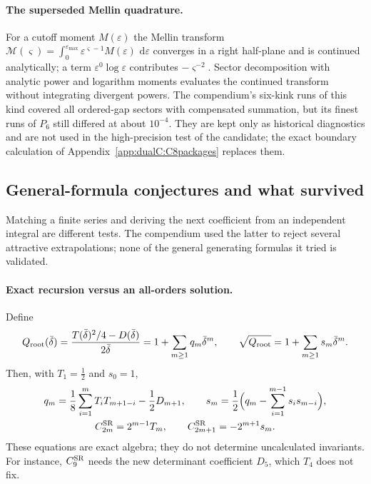 \documentclass[11pt,a4paper]{article}
\numberwithin{equation}{section}
\newcommand{\dd}{\,\mathrm d}
\newcommand{\CSR}{C^{\rm SR}}
\newcommand{\db}{\bar\delta}
\begin{document}
\paragraph{The superseded Mellin quadrature.} For a cutoff moment $M(\varepsilon)$ the Mellin transform
$\mathcal M(\varsigma)=\int_0^{\varepsilon_{\max}}\varepsilon^{\varsigma-1}M(\varepsilon)\,\dd\varepsilon$ converges
in a right half-plane and is continued analytically; a term $\varepsilon^0\log\varepsilon$ contributes
$-\varsigma^{-2}$. Sector
decomposition with analytic power and logarithm moments evaluates the continued transform without integrating
divergent powers. The compendium's six-kink runs of this kind covered all ordered-gap sectors with compensated
summation, but its finest runs of $P_6$ still differed at about $10^{-4}$. They are kept only as historical
diagnostics and are not used in the high-precision test of the candidate; the exact boundary calculation of
Appendix~\ref{app:dualC:C8packages} replaces them.

\subsection{General-formula conjectures and what survived}\label{app:dualC:conjectures}
Matching a finite series and deriving the next coefficient from an independent integral are different tests. The
compendium used the latter to reject several attractive extrapolations; none of the general generating formulas it
tried is validated.

\paragraph{Exact recursion versus an all-orders solution.} Define
\begin{equation}
 Q_{\rm root}(\db)=\frac{T(\db)^2/4-D(\db)}{2\db}=1+\sum_{m\ge1}q_m\db^m,\qquad
 \sqrt{Q_{\rm root}}=1+\sum_{m\ge1}s_m\db^m .
\end{equation}
Then, with $T_1=\frac12$ and $s_0=1$,
\begin{equation}
\begin{gathered}
 q_m=\frac18\sum_{i=1}^mT_iT_{m+1-i}-\frac12D_{m+1},\qquad
 s_m=\frac12\Bigl(q_m-\sum_{i=1}^{m-1}s_is_{m-i}\Bigr),\\
 \CSR_{2m}=2^{m-1}T_m,\qquad \CSR_{2m+1}=-2^{m+1}s_m .
\end{gathered}
 \label{eq:dualC:allrecursion}
\end{equation}
These equations are exact algebra; they do not determine uncalculated invariants. For instance, $\CSR_9$ needs the new
determinant coefficient $D_5$, which $T_4$ does not fix.
\end{document}
